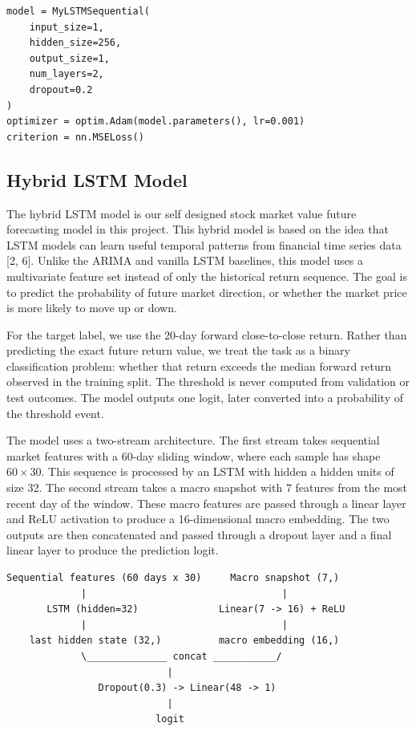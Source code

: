 \documentclass{article}
\begin{document}
\begin{verbatim}
model = MyLSTMSequential(
    input_size=1,
    hidden_size=256,
    output_size=1,
    num_layers=2,
    dropout=0.2
)
optimizer = optim.Adam(model.parameters(), lr=0.001)
criterion = nn.MSELoss()
\end{verbatim}

\subsection{Hybrid LSTM Model}

The hybrid LSTM model is our self designed stock market value future forecasting model in this project. This hybrid model is based on the idea that LSTM models can learn useful temporal patterns from financial time series data [2, 6]. Unlike the ARIMA and vanilla LSTM baselines, this model uses a multivariate feature set instead of only the historical return sequence. The goal is to predict the probability of future market direction, or whether the market price is more likely to move up or down.

For the target label, we use the 20-day forward close-to-close return. Rather than predicting the exact future return value, we treat the task as a binary classification problem: whether that return exceeds the median forward return observed in the training split. The threshold is never computed from validation or test outcomes. The model outputs one logit, later converted into a probability of the threshold event.

The model uses a two-stream architecture. The first stream takes sequential market features with a 60-day sliding window, where each sample has shape $60 \times 30$. This sequence is processed by an LSTM with hidden a hidden units of size 32. The second stream takes a macro snapshot with 7 features from the most recent day of the window. These macro features are passed through a linear layer and ReLU activation to produce a 16-dimensional macro embedding. The two outputs are then concatenated and passed through a dropout layer and a final linear layer to produce the prediction logit.

\vspace{0.8 em}
\begin{verbatim}
Sequential features (60 days x 30)     Macro snapshot (7,)
             |                                  |
       LSTM (hidden=32)              Linear(7 -> 16) + ReLU
             |                                  |
    last hidden state (32,)          macro embedding (16,)
             \______________ concat ___________/
                            |
                Dropout(0.3) -> Linear(48 -> 1)
                            |
                          logit
\end{verbatim}
\vspace{0.8 em}
\end{document}
